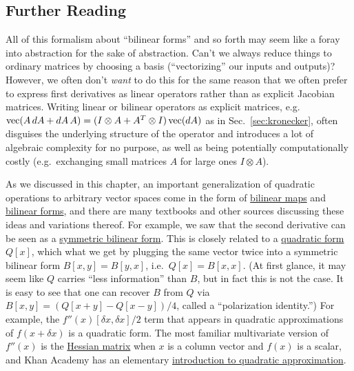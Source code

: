 \subsection{Further Reading}

All of this formalism about ``bilinear forms'' and so forth may seem like a foray into abstraction for the sake of abstraction.  Can't we always reduce things to ordinary matrices by choosing a basis (``vectorizing'' our inputs and outputs)?  However, we often don't \emph{want} to do this for the same reason that we often prefer to express first derivatives as linear operators rather than as explicit Jacobian matrices.   Writing linear or bilinear operators as explicit matrices, e.g.~$\operatorname{vec}(A\,dA + dA\,A) = (I\otimes A + A^T \otimes I)\operatorname{vec}(dA)$ as in Sec.~\ref{sec:kronecker}, often disguises the underlying structure of the operator and introduces a lot of algebraic complexity for no purpose, as well as being potentially computationally costly (e.g.~exchanging small matrices $A$ for large ones $I \otimes A$). 

As we discussed in this chapter, an important generalization of quadratic operations to arbitrary vector spaces come in the form of \href{https://en.wikipedia.org/wiki/Bilinear_map}{bilinear maps} and \href{https://en.wikipedia.org/wiki/Bilinear_form}{bilinear forms}, and there are many textbooks and other sources discussing these ideas and variations thereof. For example, we saw that the second derivative can be seen as a \href{https://en.wikipedia.org/wiki/Symmetric_bilinear_form}{symmetric bilinear form}. This is closely related to a \href{https://en.wikipedia.org/wiki/Quadratic_form}{quadratic form} $Q[x]$, which what we get by plugging the same vector twice into a symmetric bilinear form $B[x,y]=B[y,x]$, i.e.~$Q[x] = B[x,x]$.  (At first glance, it may seem like $Q$ carries ``less information'' than $B$, but in fact this is not the case.  It is easy to see that one can recover $B$ from $Q$ via $B[x,y] = (Q[x+y] - Q[x-y])/4$, called a ``polarization identity.'') For example, the $f''(x) [\delta x, \delta x]/2$ term that appears in quadratic approximations of $f(x+ \delta x)$ is a quadratic form. The most familiar multivariate version of $f''(x)$ is the \href{https://en.wikipedia.org/wiki/Hessian_matrix}{Hessian matrix} when $x$ is a column vector and $f(x)$ is a scalar, and Khan Academy has an elementary \href{https://www.khanacademy.org/math/multivariable-calculus/applications-of-multivariable-derivatives/quadratic-approximations/a/quadratic-approximation}{introduction to quadratic approximation}.

